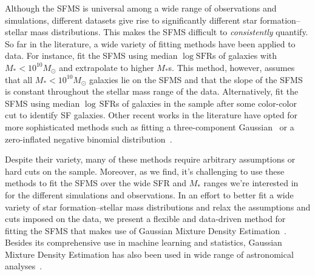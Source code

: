 \documentclass[preprint2,tighten]{aastex62}
\begin{document}
Although the SFMS is universal among a wide range of observations
and simulations, different datasets give rise to significantly different 
star formation--stellar mass distributions. This makes the SFMS difficult 
to \emph{consistently} quantify. So far in the literature, a wide variety 
of fitting methods have been applied to data. For instance, \cite{bluck2016} 
fit the SFMS using median $\log\mathrm{SFR}$s of galaxies with 
$M_* < 10^{10}M_\odot$ and extrapolate to higher $M_*$s. This method, however, 
assumes that all $M_* < 10^{10}M_\odot$ galaxies lie on the SFMS and that 
the slope of the SFMS is constant throughout the stellar mass range of the 
data. Alternatively, \cite{lee2015} fit the SFMS using median 
$\log\,\mathrm{SFR}$s of galaxies in the sample after some color-color cut 
to identify SF galaxies. Other recent works in the literature have opted 
for more sophisticated methods such as fitting a three-component
Gaussian~\citep{bisigello2018} or a zero-inflated negative binomial 
distribution~\citep{feldmann2017}. 

Despite their variety, many of these methods require arbitrary assumptions 
or hard cuts on the sample. Moreover, as we find, it's challenging to use 
these methods to fit the SFMS over the wide SFR and $M_*$ ranges we're 
interested in for the different simulations and observations. In an effort 
to better fit a wide variety of star formation--stellar mass distributions 
and relax the assumptions and cuts imposed on the data, we present a flexible 
and data-driven method for fitting the SFMS that makes use of Gaussian Mixture 
Density Estimation~\citep[GMMs;][]{Press:1992:NRC:148286, 9780471006268}. 
Besides its comprehensive use in machine learning and statistics, Gaussian 
Mixture Density Estimation has also been used in wide range of astronomical 
analyses~\citep{hogg2010,bovy2011,lee2012,taylor2015}.
\end{document}
